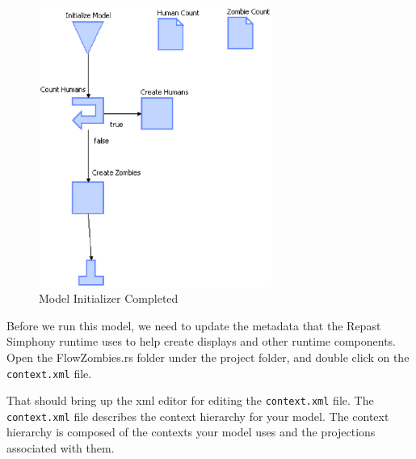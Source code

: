\documentclass[11pt]{amsart}
\begin{document}
\begin{figure}[p]
\begin{center}
\vspace{.2in}
\centerline {
\includegraphics[width=3in]{figs/ModelInitializer_complete.eps}
}
\caption{Model Initializer Completed}
\label{fig:micomplete}
\end{center}
\end{figure}

\FloatBarrier

Before we run this model, we need to update the metadata that the Repast Simphony runtime uses to help create displays and other runtime components. Open the FlowZombies.rs folder under the project folder, and double click on the \texttt{context.xml} file.

That should bring up the xml editor for editing the \texttt{context.xml} file. The \texttt{context.xml} file describes the context hierarchy for your model. The context hierarchy is composed of the contexts your model uses and the projections associated with them. 
\end{document}
